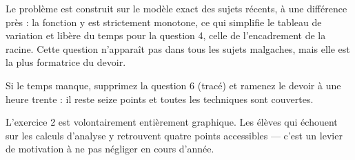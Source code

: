 \begin{notepourlaclasse}
Le problème est construit sur le modèle exact des sujets récents, à une
différence près : la fonction y est strictement monotone, ce qui simplifie
le tableau de variation et libère du temps pour la question 4, celle de
l'encadrement de la racine. Cette question n'apparaît pas dans tous les
sujets malgaches, mais elle est la plus formatrice du devoir.

Si le temps manque, supprimez la question 6 (tracé) et ramenez le devoir à
une heure trente : il reste seize points et toutes les techniques sont
couvertes.

L'exercice 2 est volontairement entièrement graphique. Les élèves qui
échouent sur les calculs d'analyse y retrouvent quatre points accessibles —
c'est un levier de motivation à ne pas négliger en cours d'année.
\end{notepourlaclasse}
